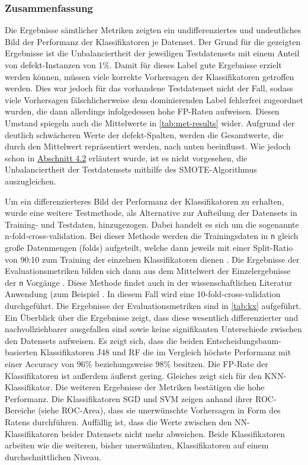 \subsubsection*{Zusammenfassung}
Die Ergebnisse sämtlicher Metriken zeigten ein undifferenziertes und undeutliches Bild der Performanz der Klassifikatoren je Datenset. Der Grund für die gezeigten Ergebnisse ist die Unbalanciertheit der jeweiligen Testdatensets mit einem Anteil von \glqq defekt\grqq -Instanzen von 1\%. Damit für dieses Label gute Ergebnisse erzielt werden können, müssen viele korrekte Vorhersagen der Klassifikatoren getroffen werden. Dies war jedoch für das vorhandene Testdatenset nicht der Fall, sodass viele Vorhersagen fälschlicherweise dem dominierenden Label \glqq fehlerfrei\grqq{} zugeordnet wurden, die dann allerdings infolgedessen hohe FP-Raten aufweisen. Diesen Umstand spiegeln auch die Mittelwerte in \autoref{tab:met-results} wider. Aufgrund der deutlich schwächeren Werte der \glqq defekt\grqq -Spalten, werden die Gesamtwerte, die durch den Mittelwert repräsentiert werden, nach unten beeinflusst. Wie jedoch schon in \hyperref[smote]{Abschnitt 4.2} erläutert wurde, ist es nicht vorgesehen, die Unbalanciertheit der Testdatensets mithilfe des SMOTE-Algorithmus auszugleichen.

Um ein differenzierteres Bild der Performanz der Klassifikatoren zu erhalten, wurde eine weitere Testmethode, als Alternative zur Aufteilung der Datensets in Training- und Testdaten, hinzugezogen. Dabei handelt es sich um die sogenannte \glqq n-fold-cross-validation\grqq. Bei dieser Methode werden die Trainingsdaten in \texttt{n} gleich große Datenmengen (\glqq folds\grqq) aufgeteilt, welche dann jeweils mit einer Split-Ratio von 90:10 zum Training der einzelnen Klassifikatoren dienen \cite{IanWitten}. Die Ergebnisse der Evaluationsmetriken bilden sich dann aus dem Mittelwert der Einzelergebnisse der \texttt{n} Vorgänge \cite{IanWitten}. Diese Methode findet auch in der wissenschaftlichen Literatur Anwendung (zum Beispiel \cite{Alam2013,Chawla2002,Alsaeedi2019}. In diesem Fall wird eine 10-fold-cross-validation durchgeführt. Die Ergebnisse der Evaluationsmetriken sind in \autoref{tab:kx} aufgeführt. Ein Überblick über die Ergebnisse zeigt, dass diese wesentlich differenzierter und nachvollziehbarer ausgefallen sind sowie keine signifikanten Unterschiede zwischen den Datensets aufweisen. Es zeigt sich, dass die beiden Entscheidungsbaum-basierten Klassifikatoren J48 und RF die im Vergleich höchste Performanz mit einer Accuracy von 96\% beziehungsweise 98\% besitzen. Die FP-Rate der Klassifikatoren ist außerdem äußerst gering. Gleiches zeigt sich für den KNN-Klassifikator. Die weiteren Ergebnisse der Metriken bestätigen die hohe Performanz. Die Klassifikatoren SGD und SVM zeigen anhand ihrer ROC-Bereiche (siehe ROC-Area), dass sie unerwünschte Vorhersagen in Form des \glqq Ratens\grqq{} durchführen. Auffällig ist, dass die Werte zwischen den NN-Klassifikatoren beider Datensets nicht mehr abweichen. Beide Klassifikatoren arbeiten wie die weiteren, bisher unerwähnten, Klassifikatoren auf einem durchschnittlichen Niveau.

